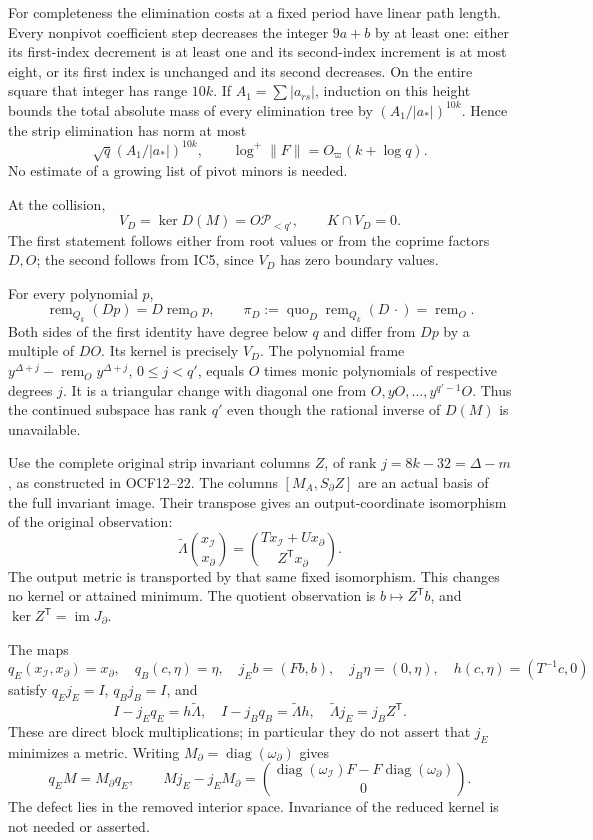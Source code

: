 \documentclass[11pt]{article}
\begin{document}
For completeness the elimination costs at a fixed period have linear path length. Every nonpivot coefficient step decreases the integer \(9a+b\) by at least one: either its first-index decrement is at least one and its second-index increment is at most eight, or its first index is unchanged and its second decreases. On the entire square that integer has range \(10k\). If \(A_1=\sum|a_{rs}|\), induction on this height bounds the total absolute mass of every elimination tree by \((A_1/|a_*|)^{10k}\). Hence the strip elimination has norm at most \[
\sqrt q(A_1/|a_*|)^{10k},\qquad
\log^+\|F\|=O_\varpi(k+\log q).
\tag{IC6}
\] No estimate of a growing list of pivot minors is needed.

At the collision, \[
V_D=\ker D(M)=O\mathcal P_{<q'},\qquad K\cap V_D=0.
\tag{IC7}
\] The first statement follows either from root values or from the coprime factors \(D,O\); the second follows from IC5, since \(V_D\) has zero boundary values.

For every polynomial \(p\), \[
\operatorname{rem}_{Q_k}(Dp)=D\operatorname{rem}_O p,\qquad
\pi_D:=\operatorname{quo}_D\operatorname{rem}_{Q_k}(D\,\cdot)
=\operatorname{rem}_O.
\tag{IC8}
\] Both sides of the first identity have degree below \(q\) and differ from \(Dp\) by a multiple of \(DO\). Its kernel is precisely \(V_D\). The polynomial frame \(y^{\Delta+j}-\operatorname{rem}_O y^{\Delta+j}\), \(0\le j<q'\), equals \(O\) times monic polynomials of respective degrees \(j\). It is a triangular change with diagonal one from \(O,yO,\ldots,y^{q'-1}O\). Thus the continued subspace has rank \(q'\) even though the rational inverse of \(D(M)\) is unavailable.

Use the complete original strip invariant columns \(Z\), of rank \(j=8k-32=\Delta-m\), as constructed in OCF12--22. The columns \([M_A,S_\partial Z]\) are an actual basis of the full invariant image. Their transpose gives an output-coordinate isomorphism of the original observation: \[
\widetilde\Lambda\binom{x_\mathcal I}{x_\partial}
=\binom{Tx_\mathcal I+Ux_\partial}{Z^{\mathsf T}x_\partial}.
\tag{IC9}
\] The output metric is transported by that same fixed isomorphism. This changes no kernel or attained minimum. The quotient observation is \(b\mapsto Z^{\mathsf T}b\), and \(\ker Z^{\mathsf T}=\operatorname{im}J_\partial\).

The maps \[
q_E(x_\mathcal I,x_\partial)=x_\partial,\quad q_B(c,\eta)=\eta,\quad
j_Eb=(Fb,b),\quad j_B\eta=(0,\eta),\quad h(c,\eta)=(T^{-1}c,0)
\] satisfy \(q_Ej_E=I\), \(q_Bj_B=I\), and \[
I-j_Eq_E=h\widetilde\Lambda,\quad
I-j_Bq_B=\widetilde\Lambda h,\quad
\widetilde\Lambda j_E=j_BZ^{\mathsf T}.
\tag{IC10}
\] These are direct block multiplications; in particular they do not assert that \(j_E\) minimizes a metric. Writing \(M_\partial=\operatorname{diag}(\omega_\partial)\) gives \[
q_EM=M_\partial q_E,\qquad
Mj_E-j_EM_\partial
=\binom{\operatorname{diag}(\omega_\mathcal I)F-F\operatorname{diag}(\omega_\partial)}0 .
\tag{IC11}
\] The defect lies in the removed interior space. Invariance of the reduced kernel is not needed or asserted.
\end{document}
